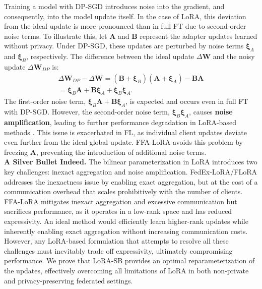Training a model with DP-SGD introduces noise into the gradient, and consequently, into the model update itself. In the case of LoRA, this deviation from the ideal update is more pronounced than in full FT due to second-order noise terms.  
To illustrate this, let \( \mathbf{A} \) and \( \mathbf{B} \) represent the adapter updates learned without privacy. Under DP-SGD, these updates are perturbed by noise terms \( \boldsymbol{\xi}_A \) and \( \boldsymbol{\xi}_B \), respectively. The difference between the ideal update \( \Delta \mathbf{W} \) and the noisy update \( \Delta \mathbf{W}_{DP} \) is:
\begin{multline}
    \Delta \mathbf{W}_{DP} - \Delta \mathbf{W} 
    = \left(\mathbf{B} + \boldsymbol{\xi}_B\right)\left(\mathbf{A} + \boldsymbol{\xi}_A\right) - \mathbf{B} \mathbf{A}  
    \\
    = \boldsymbol{\xi}_B \mathbf{A} + \mathbf{B} \boldsymbol{\xi}_A + \boldsymbol{\xi}_B \boldsymbol{\xi}_A.
\end{multline}
The first-order noise term, \( \boldsymbol{\xi}_B \mathbf{A} + \mathbf{B} \boldsymbol{\xi}_A \), is expected and occurs even in full FT with DP-SGD. 
However, the second-order noise term, \( \boldsymbol{\xi}_B \boldsymbol{\xi}_A \), causes \textbf{noise amplification}, leading to further performance degradation in LoRA-based methods \citep{sun2024improving}.  
This issue is exacerbated in FL, as individual client updates deviate even further from the ideal global update. FFA-LoRA avoids this problem by freezing \( \mathbf{A} \), preventing the introduction of additional noise terms.
\\

\textbf{A Silver Bullet Indeed.}
The bilinear parameterization in LoRA introduces two key challenges: inexact aggregation and noise amplification. 
FedEx-LoRA/FLoRA addresses the inexactness issue by enabling exact aggregation, but at the cost of a communication overhead that scales prohibitively with the number of clients. 
FFA-LoRA mitigates inexact aggregation and excessive communication but sacrifices performance, as it operates in a low-rank space and has reduced expressivity.
An ideal method would efficiently learn higher-rank updates while inherently enabling exact aggregation without increasing communication costs. However, any LoRA-based formulation that attempts to resolve all these challenges must inevitably trade off expressivity, ultimately compromising performance. 
We prove that LoRA-SB provides an optimal reparameterization of the updates, effectively overcoming all limitations of LoRA in both non-private and privacy-preserving federated settings.
